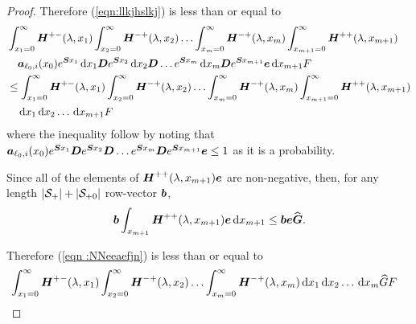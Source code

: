 \begin{proof}
    Therefore (\ref{eqn:llkjhslkj}) is less than or equal to 
	\begin{align}
		&\int_{x_1=0}^\infty \boldsymbol H^{+-}(\lambda,x_1)\nonumber
		\int_{x_2=0}^\infty \boldsymbol H^{-+}(\lambda,x_2) 
		\hdots \int_{x_m=0}^\infty \boldsymbol H^{-+}(\lambda, x_m) 
		\int_{x_{m+1}=0}^\infty \boldsymbol H^{++}(\lambda,x_{m+1}) 
		\\&\quad\boldsymbol   a_{\ell_0,i}(x_0)e^{\boldsymbol{S}x_1}\, \mathrm{d} x_1 \boldsymbol{D}e^{\boldsymbol{S}x_2} \, \mathrm{d} x_2 \boldsymbol{D}\dots e^{\boldsymbol{S}x_m} \, \mathrm{d} x_m \boldsymbol{D}e^{\boldsymbol{S}x_{m+1}}{\boldsymbol e} \, \mathrm{d} x_{m+1} F\nonumber 
		\\&\leq\int_{x_1=0}^\infty \boldsymbol H^{+-}(\lambda,x_1)\nonumber
		\int_{x_2=0}^\infty \boldsymbol H^{-+}(\lambda,x_2) 
		\hdots \int_{x_m=0}^\infty \boldsymbol H^{-+}(\lambda, x_m) 
		\int_{x_{m+1}=0}^\infty \boldsymbol H^{++}(\lambda,x_{m+1}) 
		\\&\quad\, \mathrm{d} x_1  \, \mathrm{d} x_2 \dots \, \mathrm{d} x_{m+1}  F \label{eqn :NNeeaefjn}
	\end{align}
	where the inequality follow by noting that \(\boldsymbol a_{\ell_0,i}(x_0)e^{\boldsymbol{S}x_1} \boldsymbol{D}e^{\boldsymbol{S}x_2} \boldsymbol{D}\dots e^{\boldsymbol{S}x_m} \boldsymbol{D}e^{\boldsymbol{S}x_{m+1}}{\boldsymbol e}\leq 1\) as it is a probability.
	        
	Since all of the elements of \(\boldsymbol H^{++}(\lambda,x_{m+1}) \boldsymbol e\) are non-negative, then, for any length \(|\mathcal{S}_+|+|\mathcal{S}_{+0}|\) row-vector \(\boldsymbol b\), 
	\[\boldsymbol b\int_{x_{m+1}} \boldsymbol H^{++}(\lambda,x_{m+1}) \boldsymbol e \, \mathrm{d} x_{m+1} \leq \boldsymbol b \boldsymbol e \widehat{\boldsymbol G}.\]

	Therefore (\ref{eqn :NNeeaefjn}) is less than or equal to 
	\begin{align}
		&\int_{x_1=0}^\infty \boldsymbol H^{+-}(\lambda,x_1)
		\int_{x_2=0}^\infty \boldsymbol H^{-+}(\lambda,x_2) 
		\hdots \int_{x_m=0}^\infty \boldsymbol H^{-+}(\lambda, x_m) 
		\, \mathrm{d} x_1  \, \mathrm{d} x_2 \dots \, \mathrm{d} x_{m} \widehat{G} F \label{eqn :NNeeaefjn12}
	\end{align}


\end{proof}
